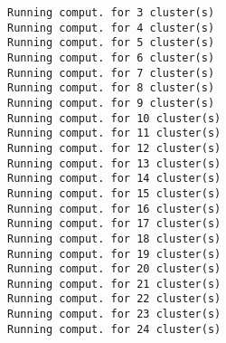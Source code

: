 \documentclass[11pt]{article}
\begin{document}
    \begin{Verbatim}[commandchars=\\\{\}]
Running comput. for 3 cluster(s)
Running comput. for 4 cluster(s)
Running comput. for 5 cluster(s)
Running comput. for 6 cluster(s)
Running comput. for 7 cluster(s)
Running comput. for 8 cluster(s)
Running comput. for 9 cluster(s)
Running comput. for 10 cluster(s)
Running comput. for 11 cluster(s)
Running comput. for 12 cluster(s)
Running comput. for 13 cluster(s)
Running comput. for 14 cluster(s)
Running comput. for 15 cluster(s)
Running comput. for 16 cluster(s)
Running comput. for 17 cluster(s)
Running comput. for 18 cluster(s)
Running comput. for 19 cluster(s)
Running comput. for 20 cluster(s)
Running comput. for 21 cluster(s)
Running comput. for 22 cluster(s)
Running comput. for 23 cluster(s)
Running comput. for 24 cluster(s)
\end{Verbatim}

    \begin{center}
    \end{center}
    { \hspace*{\fill} \\}
    
\end{document}
